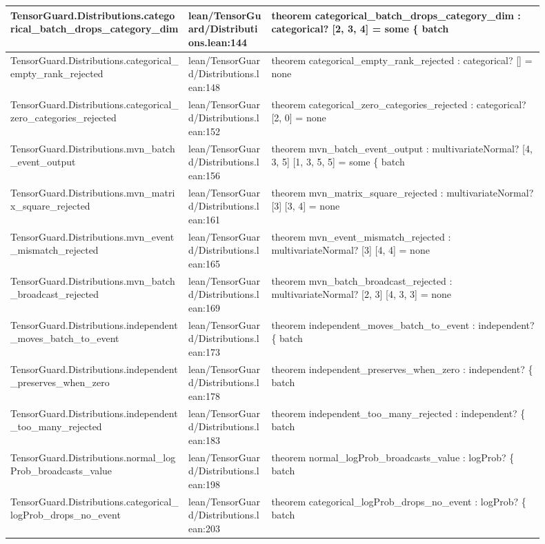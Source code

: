\documentclass[10pt]{article}
\begin{document}
\begin{longtable}{|p{0.30\linewidth}|p{0.14\linewidth}|p{0.46\linewidth}|}
\hline
TensorGuard.Distributions.categorical\_batch\_drops\_category\_dim & lean/TensorGuard/Distributions.lean:144 & theorem categorical\_batch\_drops\_category\_dim : categorical? [2, 3, 4] = some \{ batch \\
\hline
TensorGuard.Distributions.categorical\_empty\_rank\_rejected & lean/TensorGuard/Distributions.lean:148 & theorem categorical\_empty\_rank\_rejected : categorical? [] = none \\
\hline
TensorGuard.Distributions.categorical\_zero\_categories\_rejected & lean/TensorGuard/Distributions.lean:152 & theorem categorical\_zero\_categories\_rejected : categorical? [2, 0] = none \\
\hline
TensorGuard.Distributions.mvn\_batch\_event\_output & lean/TensorGuard/Distributions.lean:156 & theorem mvn\_batch\_event\_output : multivariateNormal? [4, 3, 5] [1, 3, 5, 5] = some \{ batch \\
\hline
TensorGuard.Distributions.mvn\_matrix\_square\_rejected & lean/TensorGuard/Distributions.lean:161 & theorem mvn\_matrix\_square\_rejected : multivariateNormal? [3] [3, 4] = none \\
\hline
TensorGuard.Distributions.mvn\_event\_mismatch\_rejected & lean/TensorGuard/Distributions.lean:165 & theorem mvn\_event\_mismatch\_rejected : multivariateNormal? [3] [4, 4] = none \\
\hline
TensorGuard.Distributions.mvn\_batch\_broadcast\_rejected & lean/TensorGuard/Distributions.lean:169 & theorem mvn\_batch\_broadcast\_rejected : multivariateNormal? [2, 3] [4, 3, 3] = none \\
\hline
TensorGuard.Distributions.independent\_moves\_batch\_to\_event & lean/TensorGuard/Distributions.lean:173 & theorem independent\_moves\_batch\_to\_event : independent? \{ batch \\
\hline
TensorGuard.Distributions.independent\_preserves\_when\_zero & lean/TensorGuard/Distributions.lean:178 & theorem independent\_preserves\_when\_zero : independent? \{ batch \\
\hline
TensorGuard.Distributions.independent\_too\_many\_rejected & lean/TensorGuard/Distributions.lean:183 & theorem independent\_too\_many\_rejected : independent? \{ batch \\
\hline
TensorGuard.Distributions.normal\_logProb\_broadcasts\_value & lean/TensorGuard/Distributions.lean:198 & theorem normal\_logProb\_broadcasts\_value : logProb? \{ batch \\
\hline
TensorGuard.Distributions.categorical\_logProb\_drops\_no\_event & lean/TensorGuard/Distributions.lean:203 & theorem categorical\_logProb\_drops\_no\_event : logProb? \{ batch \\

\end{longtable}
\end{document}
